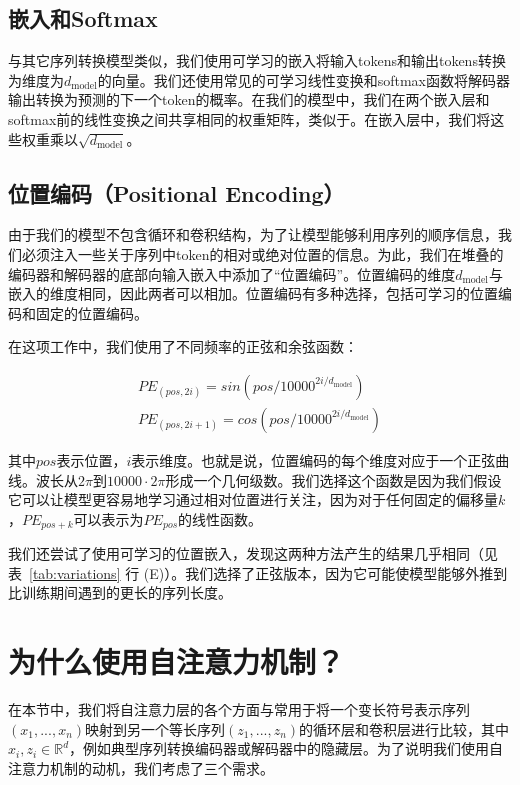 \documentclass[lang=cn,a4paper,newtx]{elegantpaper}
\newcommand{\dmodel}{d_{\text{model}}}
\begin{document}
\subsection{嵌入和Softmax}

与其它序列转换模型类似，我们使用可学习的嵌入将输入tokens和输出tokens转换为维度为$\dmodel$的向量。我们还使用常见的可学习线性变换和softmax函数将解码器输出转换为预测的下一个token的概率。在我们的模型中，我们在两个嵌入层和softmax前的线性变换之间共享相同的权重矩阵，类似于。在嵌入层中，我们将这些权重乘以$\sqrt{\dmodel}$。

\subsection{位置编码（Positional Encoding）}

由于我们的模型不包含循环和卷积结构，为了让模型能够利用序列的顺序信息，我们必须注入一些关于序列中token的相对或绝对位置的信息。为此，我们在堆叠的编码器和解码器的底部向输入嵌入中添加了“位置编码”。位置编码的维度$\dmodel$与嵌入的维度相同，因此两者可以相加。位置编码有多种选择，包括可学习的位置编码和固定的位置编码。

在这项工作中，我们使用了不同频率的正弦和余弦函数：

\begin{align*}
  PE_{(pos,2i)} = sin(pos / 10000^{2i/\dmodel}) \\
  PE_{(pos,2i+1)} = cos(pos / 10000^{2i/\dmodel})
\end{align*}

其中$pos$表示位置，$i$表示维度。也就是说，位置编码的每个维度对应于一个正弦曲线。波长从$2\pi$到$10000 \cdot 2\pi$形成一个几何级数。我们选择这个函数是因为我们假设它可以让模型更容易地学习通过相对位置进行关注，因为对于任何固定的偏移量$k$，$PE_{pos+k}$可以表示为$PE_{pos}$的线性函数。

我们还尝试了使用可学习的位置嵌入，发现这两种方法产生的结果几乎相同（见表~\ref{tab:variations} 行 (E)）。我们选择了正弦版本，因为它可能使模型能够外推到比训练期间遇到的更长的序列长度。

\section{为什么使用自注意力机制？}

在本节中，我们将自注意力层的各个方面与常用于将一个变长符号表示序列$(x_1, ..., x_n)$映射到另一个等长序列$(z_1, ..., z_n)$的循环层和卷积层进行比较，其中$x_i, z_i \in \mathbb{R}^d$，例如典型序列转换编码器或解码器中的隐藏层。为了说明我们使用自注意力机制的动机，我们考虑了三个需求。
\end{document}
